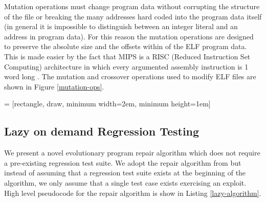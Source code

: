 \documentclass{sigcomm-alternate}
\begin{document}
Mutation operations must change program data without corrupting the
structure of the file or breaking the many addresses hard coded into
the program data itself (in general it is impossible to distinguish
between an integer literal and an address in program data).  For this
reason the mutation operations are designed to preserve the absolute
size and the offsets within of the ELF program data.  This is made
easier by the fact that MIPS is a RISC (Reduced Instruction Set
Computing) architecture in which every argumented assembly instruction
is 1 word long \cite{hennessy1982mips}.  The mutation and crossover
operations used to modify ELF files are shown in Figure \ref{mutation-ops}.

 = [rectangle, draw, minimum width=2em, minimum height=1em]
\subsection{Lazy on demand Regression Testing}
\label{sec-3-3}
We present a novel evolutionary program repair algorithm which does
not require a pre-existing regression test suite.  We adopt the repair
algorithm from \cite{forrest2009genetic} but instead of assuming that a
regression test suite exists at the beginning of the algorithm, we
only assume that a single test case exists exercising an exploit.
High level pseudocode for the repair algorithm is show in Listing
\ref{lazy-algorithm}.
\end{document}

